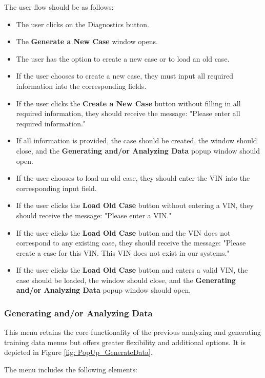\documentclass[]{scrreprt}
\begin{document}
The user flow should be as follows:

\begin{itemize}
    \item The user clicks on the Diagnostics button.
    \item The \textbf{Generate a New Case} window opens.
    \item The user has the option to create a new case or to load an old case.
    \item If the user chooses to create a new case, they must input all required information into the corresponding fields.
    \item If the user clicks the \textbf{Create a New Case} button without filling in all required information, they should receive the message: "Please enter all required information."
    \item If all information is provided, the case should be created, the window should close, and the \textbf{Generating and/or Analyzing Data} popup window should open.
    \item If the user chooses to load an old case, they should enter the VIN into the corresponding input field.
    \item If the user clicks the \textbf{Load Old Case} button without entering a VIN, they should receive the message: "Please enter a VIN."
    \item If the user clicks the \textbf{Load Old Case} button and the VIN does not correspond to any existing case, they should receive the message: "Please create a case for this VIN. This VIN does not exist in our systems."
    \item If the user clicks the \textbf{Load Old Case} button and enters a valid VIN, the case should be loaded, the window should close, and the \textbf{Generating and/or Analyzing Data} popup window should open.
\end{itemize}

\subsubsection{Generating and/or Analyzing Data}

This menu retains the core functionality of the previous analyzing and generating training data menus but offers greater flexibility and additional options. It is depicted in Figure \ref{fig: PopUp_GenerateData}.

The menu includes the following elements:
\end{document}
